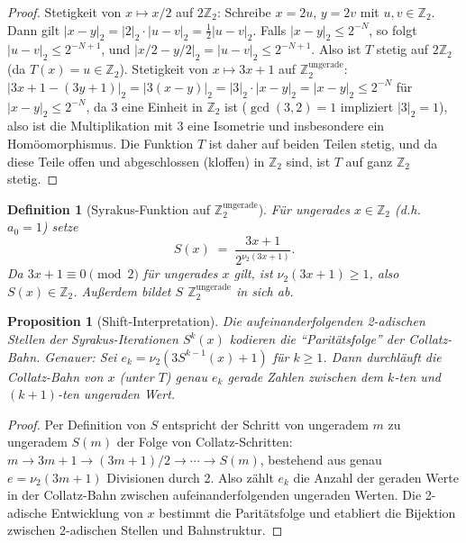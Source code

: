 \documentclass[12pt,a4paper]{article}
\newtheorem{proposition}[theorem]{Proposition}
\newtheorem{definition}[theorem]{Definition}
\begin{document}
\begin{proof}
Stetigkeit von $x \mapsto x/2$ auf $2\mathbb{Z}_2$: Schreibe $x = 2u$, $y = 2v$
mit $u, v \in \mathbb{Z}_2$. Dann gilt $|x - y|_2 = |2|_2 \cdot |u-v|_2 = \tfrac{1}{2}|u-v|_2$.
Falls $|x - y|_2 \leq 2^{-N}$, so folgt $|u-v|_2 \leq 2^{-N+1}$, und
$|x/2 - y/2|_2 = |u - v|_2 \leq 2^{-N+1}$.
Also ist $T$ stetig auf $2\mathbb{Z}_2$ (da $T(x) = u \in \mathbb{Z}_2$).
Stetigkeit von $x \mapsto 3x+1$ auf $\mathbb{Z}_2^{\text{ungerade}}$:
$|3x+1 - (3y+1)|_2 = |3(x-y)|_2 = |3|_2 \cdot |x-y|_2 = |x-y|_2 \leq 2^{-N}$
für $|x-y|_2 \leq 2^{-N}$, da $3$ eine Einheit in $\mathbb{Z}_2$ ist
($\gcd(3,2)=1$ impliziert $|3|_2 = 1$), also ist die Multiplikation mit 3 eine
Isometrie und insbesondere ein Homöomorphismus. Die Funktion $T$ ist daher auf
beiden Teilen stetig, und da diese Teile offen und abgeschlossen (kloffen) in
$\mathbb{Z}_2$ sind, ist $T$ auf ganz $\mathbb{Z}_2$ stetig.
\end{proof}

\begin{definition}[Syrakus-Funktion auf $\mathbb{Z}_2^{\text{ungerade}}$]\label{def:S_fort}
Für ungerades $x \in \mathbb{Z}_2$ (d.h.\ $a_0 = 1$) setze
\[
  S(x) \;=\; \frac{3x+1}{2^{\nu_2(3x+1)}}.
\]
Da $3x + 1 \equiv 0 \pmod{2}$ für ungerades $x$ gilt, ist $\nu_2(3x+1) \geq 1$,
also $S(x) \in \mathbb{Z}_2$. Außerdem bildet $S$ $\mathbb{Z}_2^{\text{ungerade}}$ in sich ab.
\end{definition}

\begin{proposition}[Shift-Interpretation]\label{prop:shift}
Die aufeinanderfolgenden 2-adischen Stellen der Syrakus-Iterationen $S^k(x)$ kodieren
die ``Paritätsfolge'' der Collatz-Bahn. Genauer: Sei $e_k = \nu_2(3 S^{k-1}(x) + 1)$
für $k \geq 1$. Dann durchläuft die Collatz-Bahn von $x$ (unter $T$) genau $e_k$
gerade Zahlen zwischen dem $k$-ten und $(k+1)$-ten ungeraden Wert.
\end{proposition}

\begin{proof}
Per Definition von $S$ entspricht der Schritt von ungeradem $m$ zu ungeradem $S(m)$
der Folge von Collatz-Schritten: $m \to 3m+1 \to (3m+1)/2 \to \cdots \to S(m)$,
bestehend aus genau $e = \nu_2(3m+1)$ Divisionen durch 2. Also zählt $e_k$ die
Anzahl der geraden Werte in der Collatz-Bahn zwischen aufeinanderfolgenden ungeraden
Werten. Die 2-adische Entwicklung von $x$ bestimmt die Paritätsfolge und etabliert
die Bijektion zwischen 2-adischen Stellen und Bahnstruktur.
\end{proof}
\end{document}

